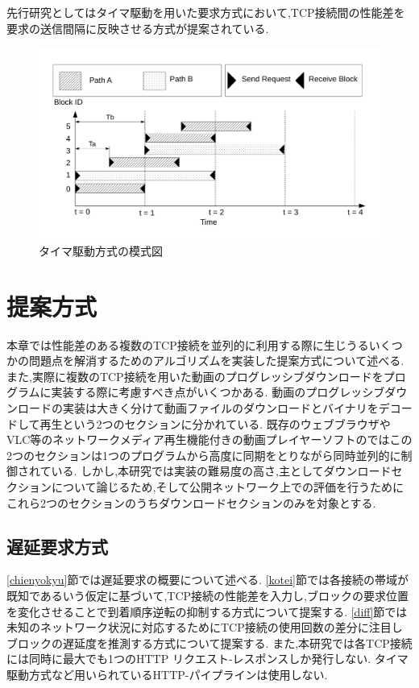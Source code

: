 \documentclass[a4j,12pt]{gradthesis_utf8}
\begin{document}
先行研究としてはタイマ駆動を用いた要求方式において,TCP接続間の性能差を要求の送信間隔に反映させる方式が提案されている.

 \begin{figure}[ht]
 	\centering
 	\includegraphics[width=16.5cm]{figure/timer.pdf}
 	\caption{タイマ駆動方式の模式図}
	\label{timer}
 \end{figure}
 
\chapter{提案方式}\label{sec:sec3}
本章では性能差のある複数のTCP接続を並列的に利用する際に生じうるいくつかの問題点を解消するためのアルゴリズムを実装した提案方式について述べる.
また,実際に複数のTCP接続を用いた動画のプログレッシブダウンロードをプログラムに実装する際に考慮すべき点がいくつかある.
動画のプログレッシブダウンロードの実装は大きく分けて動画ファイルのダウンロードとバイナリをデコードして再生という2つのセクションに分かれている.
既存のウェブブラウザやVLC\cite{vlc}等のネットワークメディア再生機能付きの動画プレイヤーソフトのではこの2つのセクションは1つのプログラムから高度に同期をとりながら同時並列的に制御されている.
しかし,本研究では実装の難易度の高さ,主としてダウンロードセクションについて論じるため,そして公開ネットワーク上での評価を行うためにこれら2つのセクションのうちダウンロードセクションのみを対象とする.

\section{遅延要求方式}
\label{chienyokyuhoshiki}
\ref{chienyokyu}節では遅延要求の概要について述べる.
\ref{kotei}節では各接続の帯域が既知であるいう仮定に基づいて,TCP接続の性能差を入力し,ブロックの要求位置を変化させることで到着順序逆転の抑制する方式について提案する.
\ref{diff}節では未知のネットワーク状況に対応するためにTCP接続の使用回数の差分に注目しブロックの遅延度を推測する方式について提案する.
また,本研究では各TCP接続には同時に最大でも1つのHTTP リクエスト-レスポンスしか発行しない.
タイマ駆動方式など用いられているHTTP-パイプラインは使用しない.
\end{document}
